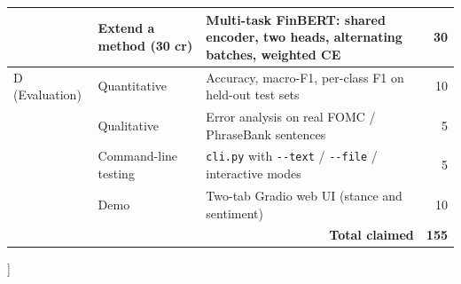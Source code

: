 \documentclass[conference, 10pt, twocolumn]{IEEEtran}
\begin{document}
\begin{@twocolumnfalse}
\begin{center}
\begin{tabularx}{\textwidth}{l l X r}
              & Extend a method (30 cr)            & Multi-task FinBERT: shared encoder, two heads, alternating batches, weighted CE \cite{liu2019mt-dnn} & 30 \\
\midrule
D (Evaluation)& Quantitative                       & Accuracy, macro-F1, per-class F1 on held-out test sets                               & 10 \\
              & Qualitative                        & Error analysis on real FOMC / PhraseBank sentences                                   & 5  \\
              & Command-line testing               & \texttt{cli.py} with \texttt{-{-}text} / \texttt{-{-}file} / interactive modes       & 5  \\
              & Demo                               & Two-tab Gradio web UI (stance and sentiment)                                         & 10 \\
\midrule
\multicolumn{3}{r}{\textbf{Total claimed}} & \textbf{155} \\
\bottomrule
\end{tabularx}
\end{center}
\vspace{1em}
\end{@twocolumnfalse}
]
\makeatother

\begin{abstract}
We study two financial-NLP classification tasks on distinct text domains:
monetary-policy \emph{stance} (hawkish / dovish / neutral) on FOMC
communications \cite{shah2023trillion} and three-class \emph{sentiment} on the
Financial PhraseBank all-agree split \cite{malo2014good}. Starting from a
TF-IDF + logistic regression baseline, we build a ladder of twelve systems
that spans linear classifiers, the Loughran--McDonald lexicon, zero-/few-shot
probes over FinBERT / BERT / RoBERTa, full fine-tuning, and a multi-task
FinBERT with a shared encoder and two task heads. Our multi-task FinBERT
reaches \textbf{97.79\%} accuracy (\textbf{0.9666} macro-F1) on sentiment and
\textbf{64.92\%} accuracy (\textbf{0.6384} macro-F1) on stance. A carefully
fine-tuned \emph{general-purpose} BERT-base with layer-wise learning-rate
decay, gradual unfreezing and label smoothing \emph{ties} the multi-task
model (97.57\% / 0.9670 sentiment; 65.12\% / 0.6383 stance). Sentiment is
near-saturated; stance--especially the dovish/hawkish boundary--remains the
harder problem and is where domain pre-training and multi-task learning
still pay off in low-data regimes.
\end{abstract}
\end{document}
